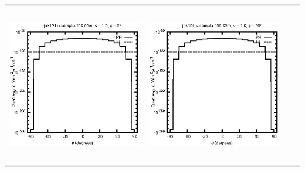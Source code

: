 \documentclass[10pt,a4paper]{article}
\begin{document}
\begin{adjustwidth}{-1.2in}{-1.2in}
\begin{tabular}{c c c c}
\includegraphics[height=7cm]{../eps/jok10_Lu_sample_100.00m_fwd.eps} &
\includegraphics[height=7cm]{../eps/jok10_Lu_sample_100.00m_cross.eps} \\
\end{tabular}

\pagebreak


\end{adjustwidth}
\end{document}
